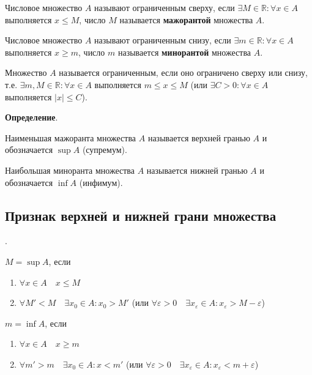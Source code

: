 \documentclass{article}
\newcommand{\parspace}{\vspace{10pt}}
\theoremstyle{break}
\begin{document}
Числовое множество $A$ называют ограниченным сверху, если 
$\exists M \in \mathbb{R}: \forall x \in A$ выполняется $x \le M$,
число $M$ называется \textbf{мажорантой} множества $A$.

Числовое множество $A$ называют ограниченным снизу, если 
$\exists m \in \mathbb{R}: \forall x \in A$ выполняется $x \ge m$,
число $m$ называется \textbf{минорантой} множества $A$.

Множество $A$ называется ограниченным, если оно ограничено сверху или снизу,
т.е. $\exists m, M \in \mathbb{R}: \forall x \in A$ выполняется $m \le x \le M$
(или $\exists C > 0: \forall x \in A$ выполняется $|x| \le C$).

\parspace

\textbf{Определение}.

Наименьшая мажоранта множества $A$ называется верхней гранью $A$ и обозначается
$\sup A$ (супремум).

Наибольшая миноранта множества $A$ называется нижней гранью $A$ и обозначается
$\inf A$ (инфимум).



\subsection{Признак верхней и нижней грани множества}.

$M = \sup A$, если 
\begin{enumerate}
    \item $\forall x \in A \quad x \le M$
    \item $\forall M' < M \quad \exists x_0 \in A: x_0 > M'$
    (или $\forall \varepsilon > 0 \quad \exists x_\varepsilon \in A: x_\varepsilon > M - \varepsilon$)
\end{enumerate}

$m = \inf A$, если 
\begin{enumerate}
    \item $\forall x \in A \quad x \ge m$
    \item $\forall m' > m \quad \exists x_0 \in A: x < m'$
    (или $\forall \varepsilon > 0 \quad \exists x_\varepsilon \in A: x_\varepsilon < m + \varepsilon$)
\end{enumerate}
\end{document}
